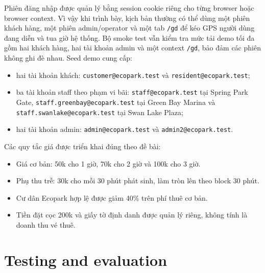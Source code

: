 Phiên đăng nhập được quản lý bằng session cookie riêng cho từng browser hoặc
browser context. Vì vậy khi trình bày, kịch bản thường có thể dùng một phiên
khách hàng, một phiên admin/operator và một tab \texttt{/gd} để kéo GPS người
dùng đang diễn và tua giờ hệ thống. Bộ smoke test vẫn kiểm tra mức tải demo tối đa gồm hai khách hàng,
hai tài khoản admin và một context \texttt{/gd}, bảo đảm các phiên không ghi đè
nhau. Seed demo cung cấp:
\begin{itemize}
  \item hai tài khoản khách: \texttt{customer@ecopark.test} và \texttt{resident@ecopark.test};
  \item ba tài khoản staff theo phạm vi bãi: \texttt{staff@ecopark.test} tại Spring Park Gate,
  \texttt{staff.greenbay@ecopark.test} tại Green Bay Marina và
  \texttt{staff.swanlake@ecopark.test} tại Swan Lake Plaza;
  \item hai tài khoản admin: \texttt{admin@ecopark.test} và \texttt{admin2@ecopark.test}.
\end{itemize}

Các quy tắc giá được triển khai đúng theo đề bài:
\begin{itemize}
  \item Giá cơ bản: 50k cho 1 giờ, 70k cho 2 giờ và 100k cho 3 giờ.
  \item Phụ thu trễ: 30k cho mỗi 30 phút phát sinh, làm tròn lên theo block 30 phút.
  \item Cư dân Ecopark hợp lệ được giảm 40\% trên phí thuê cơ bản.
  \item Tiền đặt cọc 200k và giấy tờ định danh được quản lý riêng, không tính là doanh thu vé thuê.
\end{itemize}

\section{Testing and evaluation}

